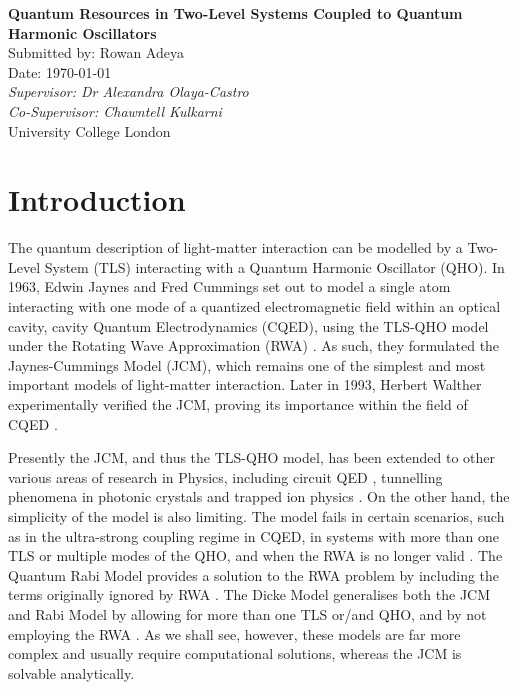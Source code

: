 \documentclass[12pt,a4paper]{article}
\begin{document}
\begin{titlepage}
    \centering
    \vspace*{2cm}
    \Huge\textbf{Quantum Resources in Two-Level Systems Coupled to Quantum Harmonic Oscillators} \\
    \vspace{1cm}
    \small{Submitted by: Rowan Adeya \\
    Date: \today} \\
    \vspace{1cm}
    \small{\textit{Supervisor: Dr Alexandra Olaya-Castro}} \\
    \small{\textit{Co-Supervisor: Chawntell Kulkarni}} \\
    

    \vfill
    \normalsize
    University College London
\end{titlepage}

\tableofcontents

\newpage

\section{Introduction} \label{intro}
The quantum description of light-matter interaction can be modelled by a Two-Level System (TLS) interacting with a Quantum Harmonic Oscillator (QHO). In 1963, Edwin Jaynes and Fred Cummings set out to model a single atom interacting with one mode of a quantized electromagnetic field within an optical cavity, cavity Quantum Electrodynamics (CQED), using the TLS-QHO model under the Rotating Wave Approximation (RWA) \cite{Context1963-JC_Original}. As such, they formulated the Jaynes-Cummings Model (JCM), which remains one of the simplest and most important models of light-matter interaction. Later in 1993, Herbert Walther experimentally verified the JCM, proving its importance within the field of CQED \cite{Context1993-JC_Verification}. 

Presently the JCM, and thus the TLS-QHO model, has been extended to other various areas of research in Physics, including circuit QED \cite{Context2018-Supercond_qubit}, tunnelling phenomena in photonic crystals \cite{Context2012-Tunneling_photons} and trapped ion physics \cite{Context1992-Trapped_ions}. On the other hand, the simplicity of the model is also limiting. The model fails in certain scenarios, such as in the ultra-strong coupling regime in CQED, in systems with more than one TLS or multiple modes of the QHO, and when the RWA is no longer valid \cite{General2024-JC_overview}. The Quantum Rabi Model provides a solution to the RWA problem by including the terms originally ignored by RWA \cite{General2024-JC_overview}. The Dicke Model generalises both the JCM and Rabi Model by allowing for more than one TLS or/and QHO, and by not employing the RWA \cite{General2024-JC_overview}. As we shall see, however, these models are far more complex and usually require computational solutions, whereas the JCM is solvable analytically. 
\end{document}
